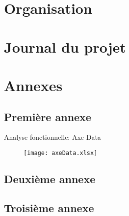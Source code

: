 \documentclass[12pt,fleqn]{book} %
\begin{document}
%
%

\part{Organisation}


\part{Journal du projet}



\appendix
\part{Annexes}
\chapter{Première annexe}

Analyse fonctionnelle: Axe Data

\begin{figure}[h!]
\centering\texttt{[image: axeData.xlsx]}
\end{figure}

\chapter{Deuxième annexe}
\chapter{Troisième annexe}

\backmatter %

%


\nocite{*}
\end{document}
